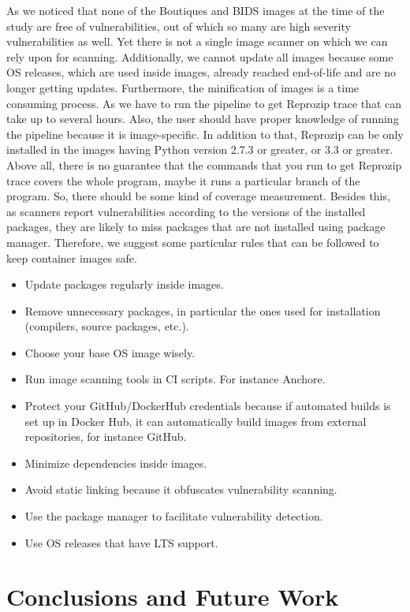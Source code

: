 \documentclass[a4paper,num-refs]{oup-contemporary}
\begin{document}
As we noticed that none of the Boutiques and BIDS images at the time of the study are free of vulnerabilities, out of which
so many are high severity vulnerabilities as well. Yet there is not a single image scanner on which we can rely upon for
scanning. Additionally, we cannot update all images because some OS releases, which are used inside images, 
already reached end-of-life and are
no longer getting updates. Furthermore, the minification of images is a time consuming process. As we have to run
the pipeline to get Reprozip trace that can take up to several hours. Also, the user should have proper knowledge
of running the pipeline because it is image-specific. In addition to that, Reprozip can be only installed
in the images having Python version 2.7.3 or greater, or 3.3 or greater. Above all, there is no guarantee that
the commands that you run to get Reprozip trace covers the whole program, maybe it runs a particular
branch of the program. So, there should be some kind of coverage measurement.
Besides this, as scanners report vulnerabilities according to the versions of the installed packages,
they are likely to miss packages that are not installed using package manager. 
Therefore, we suggest some particular rules that can be
followed to keep container images safe.
\begin{itemize}
	\item Update packages regularly inside images.
	\item Remove unnecessary packages, in particular the ones used for installation (compilers, source packages, etc.).
	\item Choose your base OS image wisely.
	\item Run image scanning tools in CI scripts. For instance Anchore.
	\item Protect your GitHub/DockerHub credentials because if automated builds is set up
in Docker Hub, it can automatically build images from external repositories, for instance GitHub.
\item Minimize dependencies inside images.
\item Avoid static linking because it obfuscates vulnerability scanning.
\item Use the package manager to facilitate vulnerability detection.
\item Use OS releases that have LTS support.
\end{itemize}
\vspace*{-2mm}
\section{Conclusions and Future Work}
\end{document}
